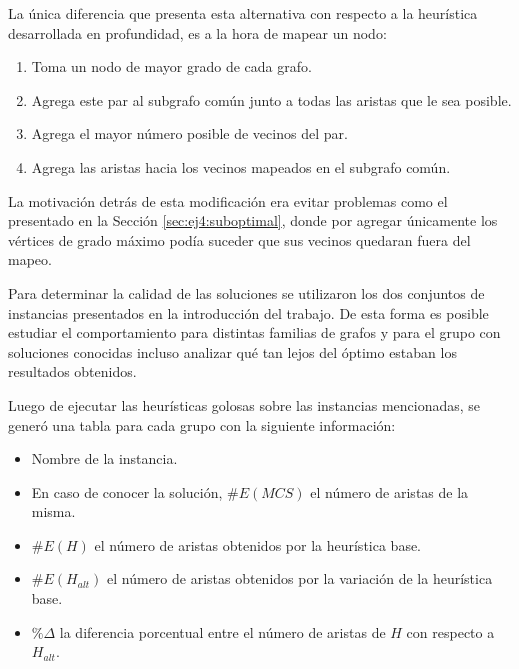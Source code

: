 La única diferencia que presenta esta alternativa con respecto a la heurística
desarrollada en profundidad, es a la hora de mapear un nodo:

\begin{enumerate}
	\item Toma un nodo de mayor grado de cada grafo.
	\item Agrega este par al subgrafo común junto a todas las aristas que le sea
		posible.
	\item Agrega el mayor número posible de vecinos del par.
	\item Agrega las aristas hacia los vecinos mapeados en el subgrafo común.
\end{enumerate}

La motivación detrás de esta modificación era evitar problemas como el presentado en
la Sección \ref{sec:ej4:suboptimal}, donde por agregar únicamente los vértices de
grado máximo podía suceder que sus vecinos quedaran fuera del mapeo.

Para determinar la calidad de las soluciones se utilizaron los dos conjuntos de
instancias presentados en la introducción del trabajo. De esta forma es posible estudiar
el comportamiento para distintas familias de grafos y para el grupo con
soluciones conocidas incluso analizar qué tan lejos del óptimo estaban los
resultados obtenidos.

Luego de ejecutar las heurísticas golosas sobre las instancias mencionadas, se
generó una tabla para cada grupo con la siguiente información:

\begin{itemize}
	\item Nombre de la instancia.
	\item En caso de conocer la solución, $\#E(MCS)$ el número de aristas de la
		misma.
	\item $\#E(H)$ el número de aristas obtenidos por la heurística base.
	\item $\#E(H_{alt})$ el número de aristas obtenidos por la variación de la heurística base.
	\item $\% \Delta$ la diferencia porcentual entre el número de aristas de $H$
		con respecto a $H_{alt}$.
\end{itemize}



